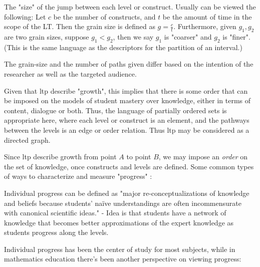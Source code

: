 \documentclass{TC}
\begin{document}
\begin{mdframed}
\begin{definition}
The "size" of the jump between each level or construct. Usually can be viewed the following: Let $c$ be the number of constructs, and $t$ be the amount of time in the scope of the LT. Then the grain size is defined as $g = \displaystyle \frac{c}{t}$. Furthermore, given $g_1 , g_2$ are two grain sizes, suppose $g_1 < g_2$, then we say $g_1$ is "coarser" and $g_2$ is "finer". (This is the same language as the descriptors for the partition of an interval.)
\end{definition}
\end{mdframed}
 \begin{remark}The grain-size and the number of paths given differ based on the intention of the researcher as well as the targeted audience.  \end{remark}

Given that \gls{ltp} describe "growth", this implies that there is some order that can be imposed on the models of student mastery over knowledge, either in terms of content, dialogue or both. Thus, the language of partially ordered sets is appropriate here, where each level or construct is an element, and the pathways between the levels is an edge or order relation. Thus \gls{ltp} may be considered as a directed graph. 

Since \gls{ltp} describe growth from point $A$ to point $B$, we may impose an \emph{order} on the set of knowledge, once constructs and levels are defined. Some common types of ways to characterize and measure "progress" \parencite{duncan_learning_2018}: 
\begin{mdframed}
\begin{definition}
Individual progress can be defined as "major re-conceptualizations of knowledge and beliefs because students' na\"ive understandings are often incommensurate with canonical scientific ideas." - Idea is that students have a network of knowledge that becomes better approximations of the expert knowledge as students progress along the levels.
\end{definition}
\end{mdframed}

Individual progress has been the center of study for most subjects, while in mathematics education there's been another perspective on viewing progress:
\end{document}
